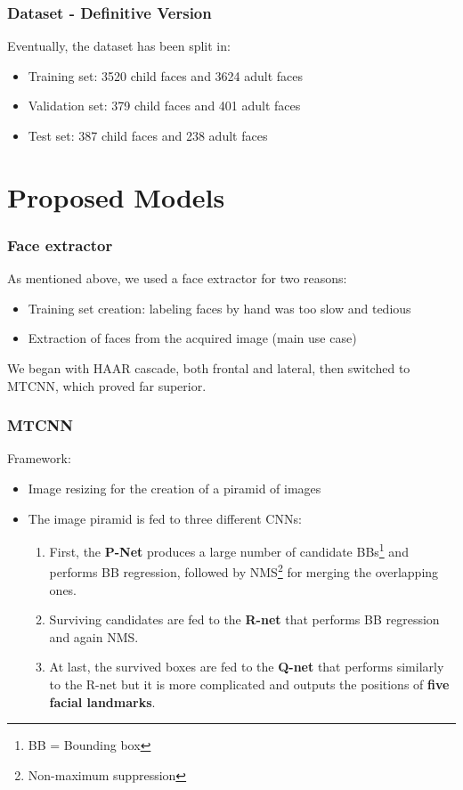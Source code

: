 \documentclass{beamer}
\begin{document}
	\begin{frame}
		\frametitle{Dataset - Definitive Version}
		Eventually, the dataset has been split in:		
		\begin{itemize}
			\item Training set: 3520 child faces and 3624 adult faces
			\item Validation set: 379 child faces and 401 adult faces
			\item Test set: 387 child faces and 238 adult faces
		\end{itemize}
	\end{frame}

	\section{Proposed Models}
	
	\begin{frame}
		\frametitle{Face extractor}
		As mentioned above, we used a face extractor for two reasons:
		\begin{itemize}
			\item Training set creation: labeling faces by hand was too slow and tedious
			\item Extraction of faces from the acquired image (main use case)
		\end{itemize}
		We began with HAAR cascade, both frontal and lateral, then switched to MTCNN, which proved far superior.
	\end{frame}
	
	\begin{frame}
		\frametitle{MTCNN}
		Framework:
		\begin{itemize}
			\item Image resizing for the creation of a piramid of images
			\item The image piramid is fed to three different CNNs:
			\begin{enumerate}
				\item First, the \textbf{P-Net} produces a large number of candidate BBs\footnote{BB = Bounding box} and performs BB regression, followed by NMS\footnote{Non-maximum suppression} for merging the overlapping ones.
				\item Surviving candidates are fed to the \textbf{R-net} that performs BB regression and again NMS.
				\item At last, the survived boxes are fed to the \textbf{Q-net} that performs similarly to the R-net but it is more complicated and outputs the positions of \textbf{five facial landmarks}.
			\end{enumerate}
		\end{itemize}
	\end{frame}
	
\end{document}
